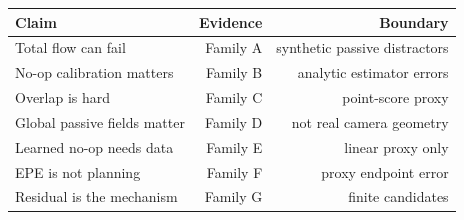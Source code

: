 \begin{tabular}{lrr}
\toprule
Claim & Evidence & Boundary\\
\midrule
Total flow can fail & Family A & synthetic passive distractors\\
No-op calibration matters & Family B & analytic estimator errors\\
Overlap is hard & Family C & point-score proxy\\
Global passive fields matter & Family D & not real camera geometry\\
Learned no-op needs data & Family E & linear proxy only\\
EPE is not planning & Family F & proxy endpoint error\\
Residual is the mechanism & Family G & finite candidates\\
\bottomrule
\end{tabular}
